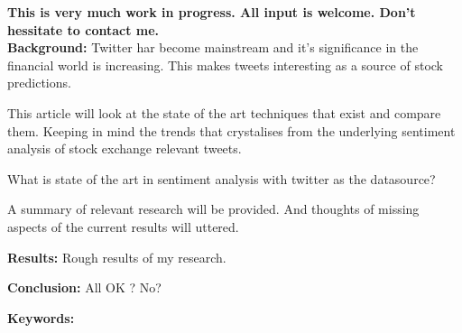 \textbf{
This is very much work in progress. All input is welcome.
Don't hessitate to contact me. 
}\\

\textbf{Background:}
Twitter har become mainstream and it's significance in the financial world is
increasing. This makes tweets interesting as a source of stock predictions.

This article will look at the state of the art techniques that exist and
compare them. Keeping in mind the trends that crystalises from the underlying
sentiment analysis of stock exchange relevant tweets. 

What is state of the art in sentiment analysis with twitter as the datasource? 

A summary of relevant research will be provided. And thoughts of missing
aspects of the current results will uttered. 

\textbf{Results:} 
Rough results of my research. 

\textbf{Conclusion:} 
All OK ? No? 

\textbf{Keywords:}
